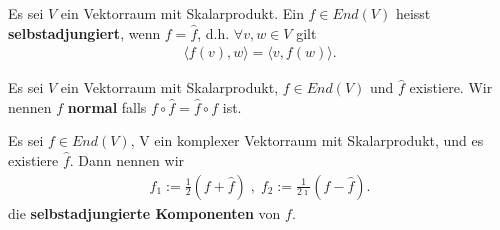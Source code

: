\documentclass[../Algebra_script.tex]{subfiles}
\begin{document}
    \begin{definition}[Selbstadjungiert]
        Es sei $V$ ein Vektorraum mit Skalarprodukt. Ein $f \in End(V)$ heisst \textbf{selbstadjungiert}, wenn $f = \hat{f}$, d.h. $\forall v, w \in V$ gilt
        \begin{align*}
            \langle f(v), w \rangle = \langle v, f(w) \rangle
        .\end{align*}
    \end{definition}

    \begin{definition}
        Es sei $V$ ein Vektorraum mit Skalarprodukt, $f \in End(V)$ und $\hat{f}$ existiere. Wir nennen $f$ \textbf{normal} falls $f\circ \hat{f} = \hat{f}
        \circ f$ ist.
    \end{definition}

    \begin{definition}
        Es sei $f \in End(V)$, V ein komplexer Vektorraum mit Skalarprodukt, und es existiere $\hat{f}$. Dann nennen wir
        \begin{align*}
            f_1 := \frac{1}{2}(f + \hat{f}) \; , \; f_2 := \frac{1}{2\imath}(f-\hat{f})
        .\end{align*}
        die \textbf{selbstadjungierte Komponenten} von $f$.
    \end{definition}
\end{document}
